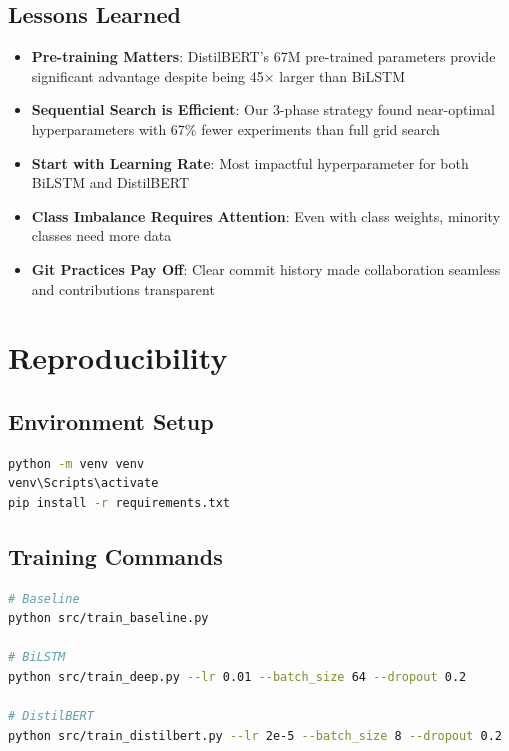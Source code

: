 \documentclass[12pt,a4paper]{article}
\begin{document}
\subsection{Lessons Learned}
\begin{itemize}
    \item \textbf{Pre-training Matters}: DistilBERT's 67M pre-trained parameters provide significant advantage despite being 45× larger than BiLSTM
    
    \item \textbf{Sequential Search is Efficient}: Our 3-phase strategy found near-optimal hyperparameters with 67\% fewer experiments than full grid search
    
    \item \textbf{Start with Learning Rate}: Most impactful hyperparameter for both BiLSTM and DistilBERT
    
    \item \textbf{Class Imbalance Requires Attention}: Even with class weights, minority classes need more data
    
    \item \textbf{Git Practices Pay Off}: Clear commit history made collaboration seamless and contributions transparent
\end{itemize}

\appendix

\section{Reproducibility}

\subsection{Environment Setup}
\begin{lstlisting}[language=bash, caption={Environment Setup}]
python -m venv venv
venv\Scripts\activate
pip install -r requirements.txt
\end{lstlisting}

\subsection{Training Commands}
\begin{lstlisting}[language=bash, caption={Training All Models}]
# Baseline
python src/train_baseline.py

# BiLSTM
python src/train_deep.py --lr 0.01 --batch_size 64 --dropout 0.2

# DistilBERT
python src/train_distilbert.py --lr 2e-5 --batch_size 8 --dropout 0.2
\end{lstlisting}
\end{document}
